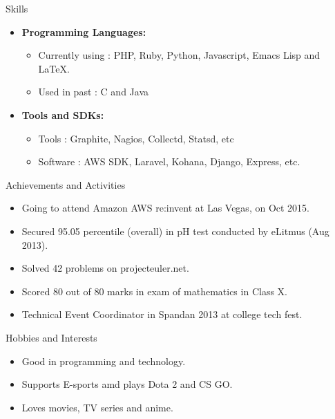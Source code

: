 \documentclass[11pt,oneside]{article}
\newenvironment{ressection}[1]{
  \vspace{4pt}
         {\fontfamily{phv}\selectfont\Large#1}
         \begin{itemize}
           \vspace{3pt}
}{
         \end{itemize}
}
\newcommand{\resitem}[1]{
  \vspace{-4pt}
\item \begin{flushleft} #1 \end{flushleft}
}
\newcommand{\ressubitem}[1]{
  \vspace{-1pt}
\item \begin{flushleft} #1 \end{flushleft}
}
\newenvironment{reslist}[1]{
  \resitem{\textbf{#1}}
  \vspace{-5pt}
  \begin{itemize}
}{
  \end{itemize}
}
\begin{document}

\begin{ressection}{Skills}
  \begin{reslist}{Programming Languages:}
    \ressubitem{Currently using : PHP, Ruby, Python, Javascript, Emacs Lisp and \LaTeX.}
    \ressubitem{Used in past : C and Java}
  \end{reslist}
  \begin{reslist}{Tools and SDKs:}
    \ressubitem{Tools : Graphite, Nagios, Collectd, Statsd, etc}
    \ressubitem{Software : AWS SDK, Laravel, Kohana, Django, Express, etc.}
  \end{reslist}
\end{ressection}


\begin{ressection}{Achievements and Activities}
  \resitem{Going to attend Amazon AWS re:invent at Las Vegas, on Oct 2015.}
  \resitem{Secured 95.05 percentile (overall) in pH test conducted by eLitmus (Aug 2013).}
  \resitem{Solved 42 problems on projecteuler.net.}
  \resitem{Scored 80 out of 80 marks in exam of mathematics in Class X.}
  \resitem{Technical Event Coordinator in Spandan 2013 at college tech fest.}
\end{ressection}


\begin{ressection}{Hobbies and Interests}
  \resitem{Good in programming and technology.}
  \resitem{Supports E-sports amd plays Dota 2 and CS GO.}
  \resitem{Loves movies, TV series and anime.}
\end{ressection}
\end{document}
